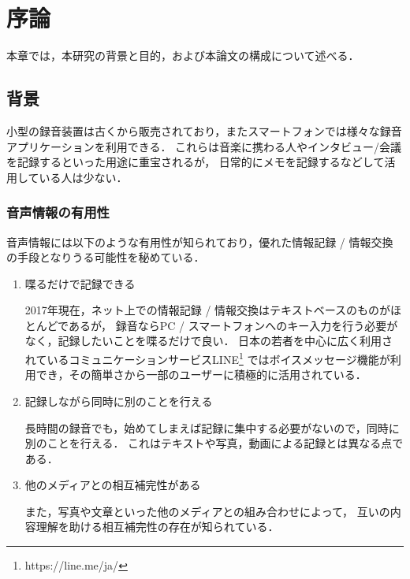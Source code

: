 \chapter{序論}
\label{chap:introduction}

本章では，本研究の背景と目的，および本論文の構成について述べる．

\newpage

\section{背景}

小型の録音装置は古くから販売されており，またスマートフォンでは様々な録音アプリケーションを利用できる．
これらは音楽に携わる人やインタビュー/会議を記録するといった用途に重宝されるが，
日常的にメモを記録するなどして活用している人は少ない．

\subsection{音声情報の有用性}

音声情報には以下のような有用性が知られており，優れた情報記録 / 情報交換の手段となりうる可能性を秘めている．

\begin{enumerate}

\item 喋るだけで記録できる

2017年現在，ネット上での情報記録 / 情報交換はテキストベースのものがほとんどであるが，
録音ならPC / スマートフォンへのキー入力を行う必要がなく，記録したいことを喋るだけで良い．
日本の若者を中心に広く利用されているコミュニケーションサービスLINE\footnote{\textsf{https://line.me/ja/}}
ではボイスメッセージ機能が利用でき，その簡単さから一部のユーザーに積極的に活用されている．

\item 記録しながら同時に別のことを行える

長時間の録音でも，始めてしまえば記録に集中する必要がないので，同時に別のことを行える．
これはテキストや写真，動画による記録とは異なる点である．

\item 他のメディアとの相互補完性がある

また，写真や文章といった他のメディアとの組み合わせによって，
互いの内容理解を助ける相互補完性の存在が知られている\cite{Nakakura}．

\end{enumerate}

\newpage

